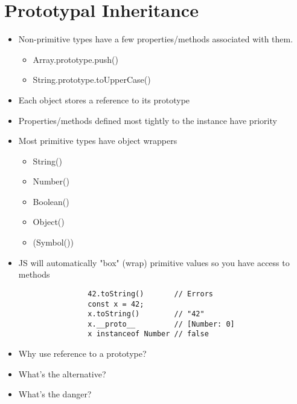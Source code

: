 \section{Prototypal Inheritance}
\begin{itemize}
	\item Non-primitive types have a few properties/methods associated with them.
	      \begin{itemize}
		      \item Array.prototype.push()
		      \item String.prototype.toUpperCase()
	      \end{itemize}
	\item Each object stores a reference to its prototype
	\item Properties/methods defined most tightly to the instance have priority
	\item Most primitive types have object wrappers
	      \begin{itemize}
		      \item String()
		      \item Number()
		      \item Boolean()
		      \item Object()
		      \item (Symbol())
	      \end{itemize}
	\item JS will automatically "box" (wrap) primitive values so you have access
	      to methods
	      \begin{verbatim}
				42.toString()		// Errors
				const x = 42;
				x.toString()		// "42"
				x.__proto__			// [Number: 0]
				x instanceof Number	// false
			  \end{verbatim}
	\item Why use reference to a prototype?
	\item What's the alternative?
	\item What's the danger?
\end{itemize}

